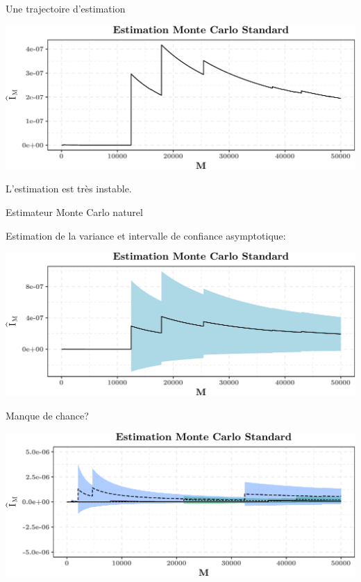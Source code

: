 \documentclass[ignorenonframetext,]{beamer}
\begin{document}
\begin{frame}{Une trajectoire d'estimation}
\protect\hypertarget{une-trajectoire-destimation}{}

\includegraphics{diapos_importance_sampling_files/figure-beamer/plot_my_mc_estimate-1.pdf}

L'estimation est très instable.

\end{frame}

\begin{frame}{Estimateur Monte Carlo naturel}
\protect\hypertarget{estimateur-monte-carlo-naturel-1}{}

Estimation de la variance et intervalle de confiance asymptotique:

\includegraphics{diapos_importance_sampling_files/figure-beamer/plot_my_mc_estimate_IC-1.pdf}

\end{frame}

\begin{frame}{Manque de chance?}
\protect\hypertarget{manque-de-chance}{}

\includegraphics{diapos_importance_sampling_files/figure-beamer/tree_monte_carlo_replicates-1.pdf}

\end{frame}
\end{document}
